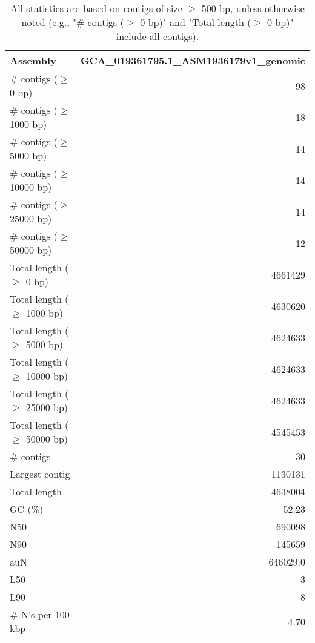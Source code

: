 \documentclass[12pt,a4paper]{article}
\begin{document}
\begin{table}[ht]
\begin{center}
\caption{All statistics are based on contigs of size $\geq$ 500 bp, unless otherwise noted (e.g., "\# contigs ($\geq$ 0 bp)" and "Total length ($\geq$ 0 bp)" include all contigs).}
\begin{tabular}{|l*{1}{|r}|}
\hline
Assembly & GCA\_019361795.1\_ASM1936179v1\_genomic \\ \hline
\# contigs ($\geq$ 0 bp) & 98 \\ \hline
\# contigs ($\geq$ 1000 bp) & 18 \\ \hline
\# contigs ($\geq$ 5000 bp) & 14 \\ \hline
\# contigs ($\geq$ 10000 bp) & 14 \\ \hline
\# contigs ($\geq$ 25000 bp) & 14 \\ \hline
\# contigs ($\geq$ 50000 bp) & 12 \\ \hline
Total length ($\geq$ 0 bp) & 4661429 \\ \hline
Total length ($\geq$ 1000 bp) & 4630620 \\ \hline
Total length ($\geq$ 5000 bp) & 4624633 \\ \hline
Total length ($\geq$ 10000 bp) & 4624633 \\ \hline
Total length ($\geq$ 25000 bp) & 4624633 \\ \hline
Total length ($\geq$ 50000 bp) & 4545453 \\ \hline
\# contigs & 30 \\ \hline
Largest contig & 1130131 \\ \hline
Total length & 4638004 \\ \hline
GC (\%) & 52.23 \\ \hline
N50 & 690098 \\ \hline
N90 & 145659 \\ \hline
auN & 646029.0 \\ \hline
L50 & 3 \\ \hline
L90 & 8 \\ \hline
\# N's per 100 kbp & 4.70 \\ \hline
\end{tabular}
\end{center}
\end{table}
\end{document}
